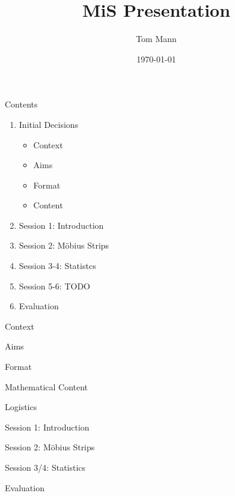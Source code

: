\documentclass{beamer}  %
\title{MiS Presentation}
\author{Tom Mann}
\date{\today}
\begin{document}
\begin{frame}
    \titlepage
\end{frame}

\begin{frame}{Contents}
    
    
    \begin{enumerate}
        \item Initial Decisions
        \begin{itemize}
            \item Context
            \item Aims
            \item Format
            \item Content
        \end{itemize}
        \item Session 1: Introduction
        \item Session 2: M\"{o}bius Strips
        \item Session 3-4: Statistcs
        \item Session 5-6: TODO
        \item Evaluation
    \end{enumerate}
\end{frame}

\begin{frame}{Context}

\end{frame}

\begin{frame}{Aims}

\end{frame}

\begin{frame}{Format}

\end{frame}   

\begin{frame}{Mathematical Content}

\end{frame}

\begin{frame}{Logistics}

\end{frame}

\begin{frame}{Session 1: Introduction}

\end{frame}

\begin{frame}{Session 2: M\"{o}bius Strips}

\end{frame}

\begin{frame}{Session 3/4: Statistics}

\end{frame}


\begin{frame}{Evaluation}

\end{frame}
\end{document}
